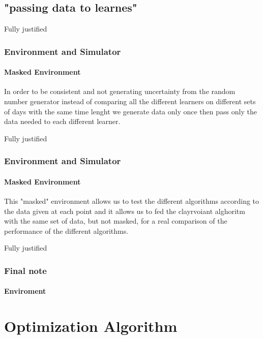 \documentclass{beamer}
\begin{document}
\subsection{"passing data to learnes"} %

\begin {frame}{Fully justified}

\frametitle{Environment and Simulator}
\framesubtitle{Masked Environment}

In order to be consistent and not generating uncertainty from the random number generator instead of 
comparing all the different learners on different sets of days with the same time lenght we generate 
data only once then pass only the data needed to each different learner.


\end{frame}


\begin {frame}{Fully justified}

\frametitle{Environment and Simulator}
\framesubtitle{Masked Environment}

This "masked" environment allows us to test the different algorithms according to the data given 
at each point and it allows us to fed the clayrvoiant alghoritm with the same set of data, 
but not masked, for a real comparison of the performance of the different algorithms.

\end{frame}


\begin {frame}{Fully justified}

\frametitle{Final note}
\framesubtitle{Enviroment}


\end{frame}



\AtBeginSection[]
{
\begin{frame}{}
    \tableofcontents[currentsection]
\end{frame}
}

\section{Optimization Algorithm}
\end{document}
